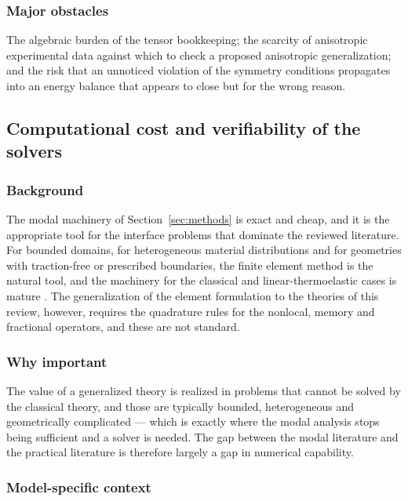 \subsubsection{Major obstacles}

The algebraic burden of the tensor bookkeeping; the scarcity of anisotropic experimental data against which to check a proposed anisotropic generalization; and the risk that an unnoticed violation of the symmetry conditions propagates into an energy balance that appears to close but for the wrong reason.

\subsection{Computational cost and verifiability of the solvers}
\label{sec:15.10}

\subsubsection{Background}

The modal machinery of Section~\ref{sec:methods} is exact and cheap, and it is the appropriate tool for the interface problems that dominate the reviewed literature. For bounded domains, for heterogeneous material distributions and for geometries with traction-free or prescribed boundaries, the finite element method is the natural tool, and the machinery for the classical and linear-thermoelastic cases is mature \cite{Hughes1980}. The generalization of the element formulation to the theories of this review, however, requires the quadrature rules for the nonlocal, memory and fractional operators, and these are not standard.

\subsubsection{Why important}

The value of a generalized theory is realized in problems that cannot be solved by the classical theory, and those are typically bounded, heterogeneous and geometrically complicated --- which is exactly where the modal analysis stops being sufficient and a solver is needed. The gap between the modal literature and the practical literature is therefore largely a gap in numerical capability.

\subsubsection{Model-specific context}

